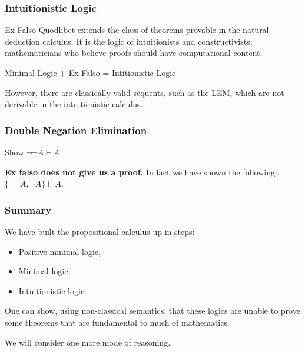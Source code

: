\documentclass{beamer}
\begin{document}
\begin{frame}
  \frametitle{Intuitionistic Logic}

	Ex Falso Quodlibet extends the class of theorems provable in the natural deduction calculus. It is the logic of intuitionists and constructivists; mathematicians who believe proofs should have computational content.
	
	\begin{center}
  		Minimal Logic + Ex Falso = Intitionistic Logic
	\end{center}

	However, there are classically valid sequents, such as the LEM, which are not derivable in the intuitionistic calculus. 

	\vspace{4cm}

\end{frame}

\begin{frame}
	\frametitle{Double Negation Elimination}
	
	Show $\lnot\lnot A \vdash A$ 
	\vspace{5cm}
	
	\pause
	
	{\bf Ex falso does not give us a proof.} In fact we have shown the following: $\{\lnot\lnot A, \lnot A\} \vdash A$.
	
\end{frame}



\begin{frame}
	\frametitle{Summary}

	We have built the propositional calculus up in steps: 

	\begin{itemize}
		\item Positive minimal logic, 
		\item Minimal logic, 
		\item Intuitionistic logic.
	\end{itemize}

	\vspace{0.5cm}

	One can show, using non-classical semantics, that these logics are unable to prove some theorems that are fundamental to much of mathematics. 

	\vspace{0.3cm}

	We will consider one more mode of reasoning. %

\end{frame}
\end{document}
